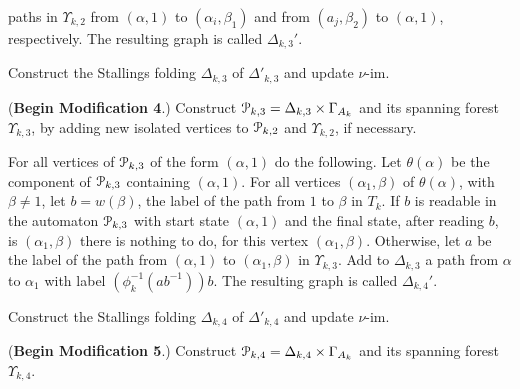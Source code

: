 \documentclass[a4paper,12pt]{article}
\renewcommand{\a}{\alpha }
\renewcommand{\b}{\beta }
\newcommand{\G}{\Gamma }
\newcommand{\D}{\Delta }
\newcommand{\U}{\Upsilon }
\newcommand{\cP}{{\cal{P}}}
\newcommand{\vim}{\nu\textrm{-im}}
\numberwithin{equation}{section}
\numberwithin{figure}{section}
\begin{document}
paths in $\U_{k,2}$ from $(\a,1)$ to $(\a_i,\b_1)$ and from $(a_j,\b_2)$ 
to $(\a,1)$,
respectively. The resulting graph is called  $\D_{k,3}'$.
\item\label{it:D10} Construct the Stallings folding $\D_{k,3}$ of 
$\D'_{k,3}$ and update $\vim$.
\item\label{it:D11} (\textbf{Begin Modification 4}.)
 Construct  $\cP_{k,3}=\D_{k,3}\times \G_{A_k}$ and its spanning
 forest $\U_{k,3}$, by adding new isolated vertices to $\cP_{k,2}$ and 
$\U_{k,2}$,
if necessary. 
\item\label{it:D12} For all vertices of $\cP_{k,3}$ of the 
form $(\a,1)$ do the following.
Let $\theta(\a)$ be the component of $\cP_{k,3}$ containing $(\a,1)$.
For all vertices $(\a_1,\b)$ of $\theta(\a)$, with $\b\neq 1$, let
$b=w(\b)$, the label of the path from $1$ to $\b$ in $T_k$. If
$b$ is readable in the automaton $\cP_{k,3}$ with start state $(\a,1)$ and
the final state, after reading $b$, is $(\a_1,\b)$ there is nothing to do,
for this vertex $(\a_1,\b)$. Otherwise, let $a$ be the label of the
path from $(\a,1)$ to $(\a_1,\b)$ in $\U_{k,3}$. Add to $\D_{k,3}$ a path from
$\a$ to $\a_1$ with label $(\phi_k^{-1}(ab^{-1}))b$.
The resulting graph is called $\D_{k,4}'$.
\item\label{it:D13} Construct the Stallings folding $\D_{k,4}$ of $\D'_{k,4}$ 
and update $\vim$.
\item\label{it:D14} (\textbf{Begin Modification 5}.)
Construct  $\cP_{k,4}=\D_{k,4}\times \G_{A_k}$ and its spanning
 forest $\U_{k,4}$. 
\end{document}
